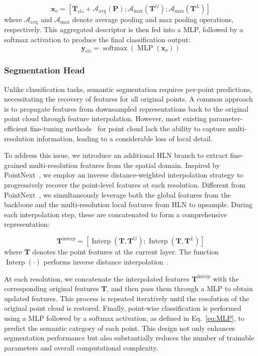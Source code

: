 \begin{equation}
\mathbf{x}_o = [\mathbf{T}_{cls} + \mathcal{A}_{\text{avg}}(\mathbf{P}); \mathcal{A}_{\text{max}}(\mathbf{T}^{G}); \mathcal{A}_{\text{max}}(\mathbf{T}^{L})]
\end{equation}
where $\mathcal{A}_{\text{avg}}$ and $\mathcal{A}_{\text{max}}$ denote average pooling and max pooling operations, respectively. This aggregated descriptor is then fed into a MLP, followed by a softmax activation to produce the final classification output:
\begin{equation}
\mathbf{y}_{cls} = \operatorname{softmax}(\operatorname{MLP}(\mathbf{x}_o))
\label{eq:MLP}
\end{equation}


\subsubsection{Segmentation Head}
Unlike classification tasks, semantic segmentation requires per-point predictions, necessitating the recovery of features for all original points. A common approach is to propagate features from downsampled representations back to the original point cloud through feature interpolation. However, most existing parameter-efficient fine-tuning methods~\cite{zha2023instance,zhou2024dynamic,liang2024parameter} for point cloud lack the ability to capture multi-resolution information, leading to a considerable loss of local detail.

To address this issue, we introduce an additional HLN branch to extract fine-grained multi-resolution features from the spatial domain. Inspired by PointNext~\cite{qian2022pointnext}, we employ an inverse distance-weighted interpolation strategy to progressively recover the point-level features at each resolution. Different from PointNext~\cite{qian2022pointnext}, we simultaneously leverage both the global features from the backbone and the multi-resolution local features from HLN to upsample. During each interpolation step, these are concatenated to form a comprehensive representation:

\begin{equation}
\mathbf{T}^{\text{interp}} = [\operatorname{Interp}(\mathbf{T}, \mathbf{T}^G); \operatorname{Interp}(\mathbf{T}, \mathbf{T}^L)]
\end{equation}
where $\mathbf{T}$ denotes the point features at the current layer. The function $\operatorname{Interp}(\cdot)$ performs inverse distance interpolation~\cite{qian2022pointnext}.

At each resolution, we concatenate the interpolated features $\mathbf{T}^{\text{interp}}$ with the corresponding original features $\mathbf{T}$, and then pass them through a MLP to obtain updated features. This process is repeated iteratively until the resolution of the original point cloud is restored. Finally, point-wise classification is performed using a MLP followed by a softmax activation, as defined in Eq.~\eqref{eq:MLP}, to predict the semantic category of each point. This design not only enhances segmentation performance but also substantially reduces the number of trainable parameters and overall computational complexity.


